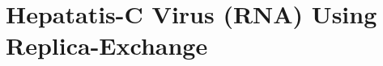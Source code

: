 \documentclass{rspublic}
\begin{document}

        


\section{Hepatatis-C Virus (RNA) Using Replica-Exchange}
\end{document}
